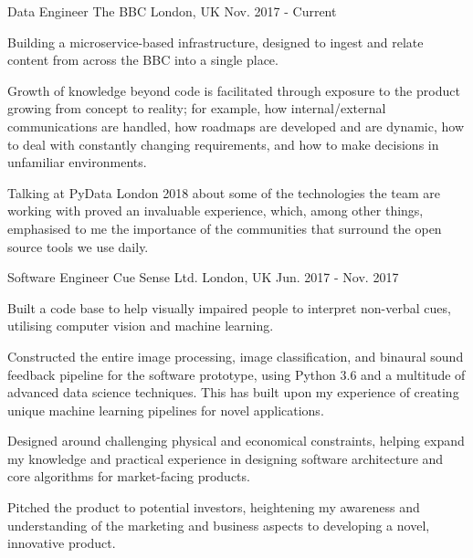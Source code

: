 \begin{cventries}
    
    \cventry
        {Data Engineer}
        {The BBC}
        {London, UK}
        {Nov. 2017 - Current}
        {
            \begin{cvitems}
                \item{Building a microservice-based infrastructure, designed to ingest and relate content from across the BBC into a single place.}
                \item{Growth of knowledge beyond code is facilitated through exposure to the product growing from concept to reality; for example, how internal/external communications are handled, how roadmaps are developed and are dynamic, how to deal with constantly changing requirements, and how to make decisions in unfamiliar environments.}
                \item{Talking at PyData London 2018 about some of the technologies the team are working with proved an invaluable experience, which, among other things, emphasised to me the importance of the communities that surround the open source tools we use daily.}
            \end{cvitems}
        }


    \cventry
        {Software Engineer}
        {Cue Sense Ltd.}
        {London, UK}
        {Jun. 2017 - Nov. 2017}
        {
            \begin{cvitems}
                \item{Built a code base to help visually impaired people to interpret non-verbal cues, utilising computer vision and machine learning.}
                \item{Constructed the entire image processing, image classification, and binaural sound feedback pipeline for the software prototype, using Python 3.6 and a multitude of advanced data science techniques. This has built upon my experience of creating unique machine learning pipelines for novel applications.}
                \item{Designed around challenging physical and economical constraints, helping expand my knowledge and practical experience in designing software architecture and core algorithms for market-facing products.}
                \item{Pitched the product to potential investors, heightening my awareness and understanding of the marketing and business aspects to developing a novel, innovative product.}
            \end{cvitems}
        }



\end{cventries}

